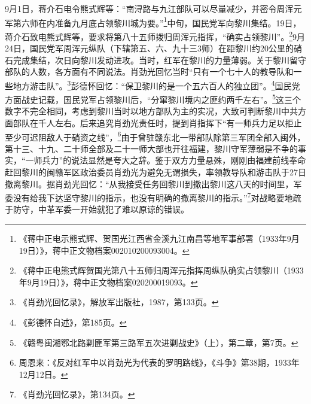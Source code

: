 9月1日，蒋介石电令熊式辉等：“南浔路与九江部队可以尽量减少，并密令周浑元军第六师在内准备九月底占领黎川城为要。”\footnote{《蒋中正电示熊式辉、贺国光江西省金溪九江南昌等地军事部署（1933年9月19日）》，蒋中正文物档案002010200093004。}中旬，国民党军向黎川集结。19日，蒋介石致电熊式辉等，要求将第八十五师拨归周浑元指挥，“确实占领黎川”。\footnote{《蒋中正电熊式辉贺国光第八十五师归周浑元指挥周纵队确实占领黎川（1933年9月19日）》，蒋中正文物档案020200019093。}9月24日，国民党军周浑元纵队（下辖第五、六、九十三3师）在距黎川约20公里的硝石完成集结，次日向黎川发动进攻。当时，红军在黎川的力量薄弱。关于黎川留守部队的人数，各方面有不同说法。肖劲光回忆当时“只有一个七十人的教导队和一些地方游击队”。\footnote{《肖劲光回忆录》，解放军出版社，1987，第133页。}彭德怀回忆：“保卫黎川的是一个五六百人的独立团”。\footnote{《彭德怀自述》，第185页。}国民党方面战史记载，国民党军占领黎川后，“分窜黎川境内之匪约两千左右”。\footnote{《赣粤闽湘鄂北路剿匪军第三路军五次进剿战史》（上），第二章，第7页。}这三个数字不完全相同，考虑到黎川当时以地方部队为主的实况，大致可判断黎川中共方面部队在千人左右。后来追究肖劲光责任时，提到肖指挥下“有一师兵力足以拒止至少可迟阻敌人于硝资之线”，\footnote{周恩来：《反对红军中以肖劲光为代表的罗明路线》，《斗争》第38期，1933年12月12日。}由于曾驻赣东北一带部队除第三军团全部入闽外，第十三、十九、二十师全部及二十一师大部也开往福建，黎川守军薄弱是不争的事实，“一师兵力”的说法显然是夸大之辞。鉴于双方力量悬殊，刚刚由福建前线奉命赶回黎川的闽赣军区政治委员肖劲光为避免无谓损失，率领教导队和游击队于27日撤离黎川。据肖劲光回忆：“从我接受任务回黎川到撤出黎川这八天的时间里，军委没有给我下达坚守黎川的指示，也没有明确的撤离黎川的指示。”\footnote{《肖劲光回忆录》，第134页。}对战略要地疏于防守，中革军委一开始就犯了难以原谅的错误。


